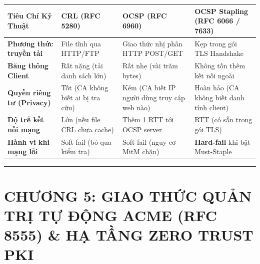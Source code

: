 \documentclass[
]{article}
\newcounter{none} %
\begin{document}
{\def\LTcaptype{none} %
\begin{longtable}[]{@{}
  >{\raggedright\arraybackslash}p{}
  >{\raggedright\arraybackslash}p{}
  >{\raggedright\arraybackslash}p{}
  >{\raggedright\arraybackslash}p{}@{}}
\toprule\noalign{}
\begin{minipage}[b]{\linewidth}\raggedright
Tiêu Chí Kỹ Thuật
\end{minipage} & \begin{minipage}[b]{\linewidth}\raggedright
CRL (RFC 5280)
\end{minipage} & \begin{minipage}[b]{\linewidth}\raggedright
OCSP (RFC 6960)
\end{minipage} & \begin{minipage}[b]{\linewidth}\raggedright
OCSP Stapling (RFC 6066 / 7633)
\end{minipage} \\
\midrule\noalign{}
\endhead
\bottomrule\noalign{}
\endlastfoot
\textbf{Phương thức truyền tải} & File tĩnh qua HTTP/FTP & Giao thức nhị
phân HTTP POST/GET & Kẹp trong gói TLS Handshake \\
\textbf{Băng thông Client} & Rất nặng (tải danh sách lớn) & Rất nhẹ (vài
trăm bytes) & Không tốn thêm kết nối ngoài \\
\textbf{Quyền riêng tư (Privacy)} & Tốt (CA không biết ai bị tra cứu) &
Kém (CA biết IP người dùng truy cập web nào) & Hoàn hảo (CA không biết
danh tính client) \\
\textbf{Độ trễ kết nối mạng} & Lớn (nếu file CRL chưa cache) & Thêm 1
RTT tới OCSP server & 0 RTT (có sẵn trong gói TLS) \\
\textbf{Hành vi khi mạng lỗi} & Soft-fail (bỏ qua kiểm tra) & Soft-fail
(nguy cơ MitM chặn) & \textbf{Hard-fail} khi bật Must-Staple \\
\end{longtable}
}

\begin{center}\rule{0.5\linewidth}{0.5pt}\end{center}

\section{CHƯƠNG 5: GIAO THỨC QUẢN TRỊ TỰ ĐỘNG ACME (RFC 8555) \& HẠ TẦNG
ZERO TRUST
PKI}\label{chux1b0ux1a1ng-5-giao-thux1ee9c-quux1ea3n-trux1ecb-tux1ef1-ux111ux1ed9ng-acme-rfc-8555-hux1ea1-tux1ea7ng-zero-trust-pki}
\end{document}
